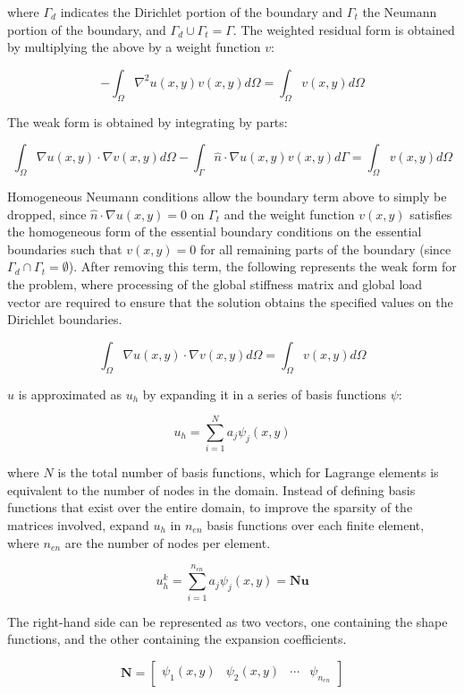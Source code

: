 \documentclass[10pt]{article}
\newcommand{\beq}{\begin{equation}}
\newcommand{\eeq}{\end{equation}}
\begin{document}
where \(\Gamma_d\) indicates the Dirichlet portion of the boundary and \(\Gamma_t\) the Neumann portion of the boundary, and \(\Gamma_d\cup\Gamma_t=\Gamma\). The weighted residual form is obtained by multiplying the above by a weight function \(v\):

\beq
-\int_\Omega \nabla^2u(x,y)v(x,y)d\Omega=\int_\Omega v(x,y)d\Omega
\eeq

The weak form is obtained by integrating by parts:

\beq
\int_\Omega \nabla u(x,y)\cdot\nabla v(x,y)d\Omega-\int_\Gamma\hat{n}\cdot\nabla u(x,y)v(x,y)d\Gamma=\int_\Omega v(x,y)d\Omega
\eeq

Homogeneous Neumann conditions allow the boundary term above to simply be dropped, since \(\hat{n}\cdot\nabla u(x,y)=0\) on \(\Gamma_t\) and the weight function \(v(x,y)\) satisfies the homogeneous form of the essential boundary conditions on the essential boundaries such that \(v(x,y)=0\) for all remaining parts of the boundary (since \(\Gamma_d\cap\Gamma_t=\emptyset\)). After removing this term, the following represents the weak form for the problem, where processing of the global stiffness matrix and global load vector are required to ensure that the solution obtains the specified values on the Dirichlet boundaries.

\beq
\int_\Omega \nabla u(x,y)\cdot\nabla v(x,y)d\Omega=\int_\Omega v(x,y)d\Omega
\eeq

\(u\) is approximated as \(u_h\) by expanding it in a series of basis functions \(\psi\):

\beq
u_h=\sum_{i=1}^{N}a_j\psi_j(x,y)
\eeq

where \(N\) is the total number of basis functions, which for Lagrange elements is equivalent to the number of nodes in the domain. Instead of defining basis functions that exist over the entire domain, to improve the sparsity of the matrices involved, expand \(u_h\) in \(n_{en}\) basis functions over each finite element, where \(n_{en}\) are the number of nodes per element. 

\beq
u_h^k=\sum_{i=1}^{n_{en}}a_j\psi_j(x,y)=\textbf{N}\textbf{u}
\eeq

The right-hand side can be represented as two vectors, one containing the shape functions, and the other containing the expansion coefficients. 

\beq
\textbf{N}=\begin{bmatrix} \psi_1(x,y) & \psi_2(x,y) & \cdots & \psi_{n_{en}}\end{bmatrix}
\eeq
\end{document}
